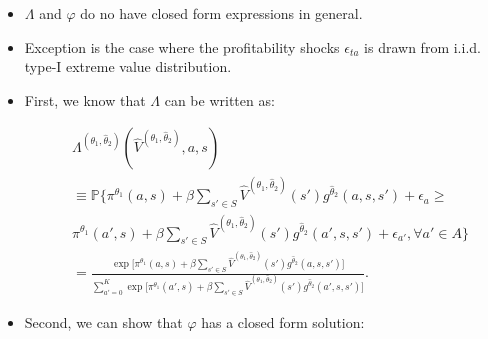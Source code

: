 \documentclass[]{book}
\providecommand{\tightlist}{%
  \setlength{\itemsep}{0pt}\setlength{\parskip}{0pt}}
\begin{document}
\begin{itemize}
\tightlist
\item
  \(\Lambda\) and \(\varphi\) do no have closed form expressions in
  general.
\item
  Exception is the case where the profitability shocks \(\epsilon_{ta}\)
  is drawn from i.i.d. type-I extreme value distribution.
\item
  First, we know that \(\Lambda\) can be written as:

  \begin{equation}
  \begin{split}
  &\Lambda^{(\theta_1, \hat{\theta}_2)}(\hat{V}^{(\theta_1, \hat{\theta}_2)}, a, s)\\
  &\equiv \mathbb{P}\Bigg\{\pi^{\theta_1}(a , s) + \beta \sum_{s' \in S} \hat{V}^{(\theta_1, \hat{\theta}_2)}(s') g^{\hat{\theta}_2}(a, s, s') + \epsilon_a \ge\\
  &\pi^{\theta_1}(a' , s) + \beta \sum_{s' \in S} \hat{V}^{(\theta_1, \hat{\theta}_2)}(s') g^{\hat{\theta}_2}(a', s, s') + \epsilon_{a'}, \forall a' \in A \Bigg\}\\
  &=\frac{\exp\Big[\pi^{\theta_1}(a , s) + \beta \sum_{s' \in S}\hat{V}^{(\theta_1, \hat{\theta}_2)}(s') g^{\hat{\theta}_2}(a, s, s')\Big]}{\sum_{a' = 0}^K \exp\Big[\pi^{\theta_1}(a' , s) + \beta \sum_{s' \in S} \hat{V}^{(\theta_1, \hat{\theta}_2)}(s') g^{\hat{\theta}_2}(a', s, s') \Big]}.
  \end{split}
  \end{equation}
\item
  Second, we can show that \(\varphi\) has a closed form solution:


\end{itemize}
\end{document}
